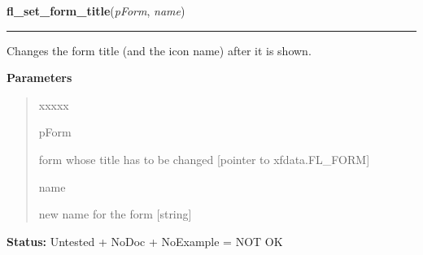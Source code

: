 \hspace{.8\funcindent}\begin{boxedminipage}{\funcwidth}

    \raggedright \textbf{fl\_set\_form\_title}(\textit{pForm}, \textit{name})

    \vspace{-1.5ex}

    \rule{\textwidth}{0.5\fboxrule}
\setlength{\parskip}{2ex}
    Changes the form title (and the icon name) after it is shown.

\setlength{\parskip}{1ex}
      \textbf{Parameters}
      \vspace{-1ex}

      \begin{quote}
        \begin{Ventry}{xxxxx}

          \item[pForm]

          form whose title has to be changed [pointer to xfdata.FL\_FORM]

          \item[name]

          new name for the form [string]

        \end{Ventry}

      \end{quote}

\textbf{Status:} Untested + NoDoc + NoExample = NOT OK



    \end{boxedminipage}

    \label{xformslib:library:fl_set_app_mainform}

    \vspace{0.5ex}

